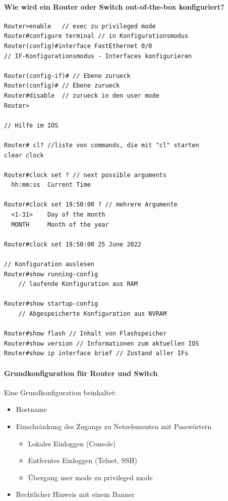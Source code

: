\documentclass[a4paper,12pt]{article}
\begin{document}
\paragraph{Wie wird ein Router oder Switch out-of-the-box konfiguriert?}
\begin{lstlisting}
Router>enable	// exec zu privileged mode
Router#configure terminal // in Konfigurationsmodus
Router(config)#interface FastEthernet 0/0
// IF-Konfigurationsmodus - Interfaces konfigurieren

Router(config-if)# // Ebene zurueck
Router(config)#	// Ebene zurueck
Router#disable	// zurueck in den user mode
Router>

// Hilfe im IOS

Router# cl? //liste von commands, die mit "cl" starten
clear clock

Router#clock set ? // next possible arguments
  hh:mm:ss	Current Time
  
Router#clock set 19:50:00 ? // mehrere Argumente
  <1-31>	Day of the month
  MONTH		Month of the year

Router#clock set 19:50:00 25 June 2022

// Konfiguration auslesen
Router#show running-config
	// laufende Konfiguration aus RAM

Router#show startup-config
	// Abgespeicherte Konfiguration aus NVRAM
	
Router#show flash // Inhalt von Flashspeicher
Router#show version // Informationen zum aktuellen IOS
Router#show ip interface brief // Zustand aller IFs
\end{lstlisting}

\paragraph{Grundkonfiguration für Router und Switch} Eine Grundkonfiguration beinhaltet:
\begin{itemize}
\item Hostname
\item Einschränkung des Zugangs zu Netzelementen mit Passwörtern
	\begin{itemize}
	\item Lokales Einloggen (Console)
	\item Entferntes Einloggen (Telnet, SSH)
	\item Übergang user mode zu privileged mode
	\end{itemize}
\item Rechtlicher Hinweis mit einem Banner
\end{itemize}
\end{document}
